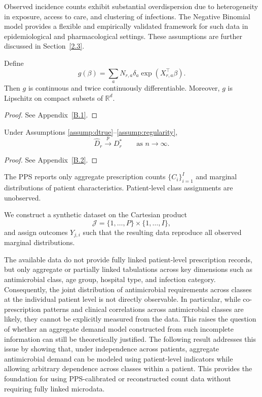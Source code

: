 \documentclass{article}
\begin{document}
\begin{remark}
Observed incidence counts exhibit substantial overdispersion due to heterogeneity in exposure, access to care, and clustering of infections. The Negative Binomial model provides a flexible and empirically validated framework for such data in epidemiological and pharmacological settings. These assumptions are further discussed in Section~\ref{2.3}.
\end{remark}

\begin{lemma}
\label{lem:smooth}
Define
\[
g(\beta)
=
\sum_a N_{r,a}\delta_a\exp(X_{r,a}^{\top}\beta).
\]
Then $g$ is continuous and twice continuously differentiable. Moreover, $g$ is Lipschitz on compact subsets of $\mathbb{R}^{d}$.
\end{lemma}

\begin{proof}
See Appendix~\ref{B.1}.
\end{proof}

\begin{theorem}
\label{thm:nbglm_consistency}
Under Assumptions \ref{assump:dtrue}--\ref{assump:regularity},
\[
\hat D_r \xrightarrow{p} D_r^{*}
\qquad \text{as } n\to\infty.
\]
\end{theorem}

\begin{proof}
See Appendix~\ref{B.2}.
\end{proof}

\begin{assumption}
\label{assump:synthetic}
The PPS reports only aggregate prescription counts $\{C_i\}_{i=1}^{I}$ and marginal distributions of patient characteristics. Patient-level class assignments are unobserved.

We construct a synthetic dataset on the Cartesian product
\[
\mathcal{J}=\{1,\dots,P\}\times\{1,\dots,I\},
\]
and assign outcomes $Y_{j,i}$ such that the resulting data reproduce all observed marginal distributions.
\end{assumption}

The available data do not provide fully linked patient-level prescription records, but only aggregate or partially linked tabulations across key
dimensions such as antimicrobial class, age group, hospital type, and infection category. Consequently, the joint distribution of antimicrobial
requirements across classes at the individual patient level is not directly observable. In particular, while co-prescription patterns and clinical
correlations across antimicrobial classes are likely, they cannot be explicitly measured from the data. This raises the question of whether an aggregate demand model constructed from such incomplete information can still be theoretically justified. The following result addresses this issue by showing that, under independence across patients, aggregate antimicrobial demand can be modeled using patient-level indicators while allowing arbitrary dependence across classes within a patient. This provides the foundation for using PPS-calibrated or reconstructed count data without requiring fully linked microdata.
\end{document}
